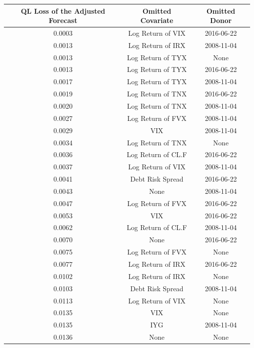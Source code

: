 \documentclass[11pt,3p,review,authoryear]{elsarticle}
\theoremstyle{definition}
\begin{document}
\begin{table}[ht]
  \centering
   \label{tab:prediction_table} 
  \begingroup\fontsize{7pt}{8pt}\selectfont
  \begin{tabular}{ccc}
    
    \hline
 QL Loss of the Adjusted Forecast& Omitted Covariate & Omitted Donor \\ 
    \hline
    0.0003 & Log Return of VIX & 2016-06-22 \\ 
    0.0013 & Log Return of IRX & 2008-11-04 \\ 
    0.0013 & Log Return of TYX & None \\ 
    0.0013 & Log Return of TYX & 2016-06-22 \\ 
    0.0017 & Log Return of TYX & 2008-11-04 \\ 
    0.0019 & Log Return of TNX & 2016-06-22 \\ 
    0.0020 & Log Return of TNX & 2008-11-04 \\ 
    0.0027 & Log Return of FVX & 2008-11-04 \\ 
    0.0029 & VIX & 2008-11-04 \\ 
    0.0034 & Log Return of TNX & None \\ 
    0.0036 & Log Return of CL.F & 2016-06-22 \\ 
    0.0037 & Log Return of VIX & 2008-11-04 \\ 
    0.0041 & Debt Risk Spread & 2016-06-22 \\ 
    0.0043 & None & 2008-11-04 \\ 
    0.0047 & Log Return of FVX & 2016-06-22 \\ 
    0.0053 & VIX & 2016-06-22 \\ 
    0.0062 & Log Return of CL.F & 2008-11-04 \\ 
    \rowcolor{yellow} 0.0070 & None & 2016-06-22 \\ 
    0.0075 & Log Return of FVX & None \\ 
    0.0077 & Log Return of IRX & 2016-06-22 \\ 
    0.0102 & Log Return of IRX & None \\ 
    0.0103 & Debt Risk Spread & 2008-11-04 \\ 
    0.0113 & Log Return of VIX & None \\ 
    0.0135 & VIX & None \\ 
    0.0135 & IYG & 2008-11-04 \\ 
    \rowcolor{yellow} 0.0136 & None & None \\ 

\end{tabular}
\end{table}
\end{document}
